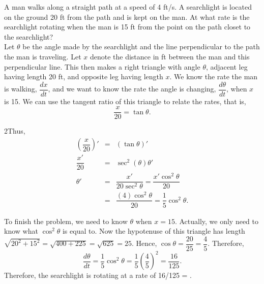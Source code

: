 \documentclass{book}
\begin{document}
\begin{Exam} A man walks along a straight path at a speed of 4 ft/s. A searchlight is located on the ground 20 ft from the path and is kept on the man. At what rate is the searchlight rotating when the man is 15 ft from the point on the path closet to the searchlight?\\

Let $\theta$ be the angle made by the searchlight and the line perpendicular to the path the man is traveling. Let $x$ denote the distance in ft between the man and this perpendicular line. This then makes a right triangle with angle $\theta$, adjacent leg having length 20 ft, and opposite leg having length $x$. We know the rate the man is walking, $\dfrac{dx}{dt}$, and we want to know the rate the angle is changing, $\dfrac{d\theta}{dt}$, when $x$ is 15. We can use the tangent ratio of this triangle to relate the rates, that is, \[\dfrac{x}{20} = \tan\theta.\] 
\begin{multicols}{2}Thus, 
\begin{eqnarray*}
\left(\dfrac{x}{20}\right)' &=& (\tan \theta)'\\
\dfrac{x'}{20} &=& \sec^2(\theta)\theta'\\
\theta' &=& \dfrac{x'}{20\sec^2\theta} = \dfrac{x'\cos^2\theta}{20}\\
&=& \dfrac{(4)\cos^2\theta}{20} = \dfrac{1}{5}\cos^2\theta.
\end{eqnarray*} 
\begin{center}
\end{center}
\end{multicols} To finish the problem, we need to know $\theta$ when $x=15$. Actually, we only need to know what $\cos^2\theta$ is equal to. Now the hypotenuse of this triangle has length $\sqrt{20^2 + 15^2} = \sqrt{400 + 225} = \sqrt{625} = 25$. Hence, $\cos \theta = \dfrac{20}{25} = \dfrac{4}{5}$. Therefore, \[\dfrac{d\theta}{dt} = \dfrac{1}{5}\cos^2\theta = \dfrac{1}{5}\left(\dfrac{4}{5}\right)^2 = \dfrac{16}{125}.\] Therefore, the searchlight is rotating at a rate of 16/125 = . 
\end{Exam}
\end{document}
